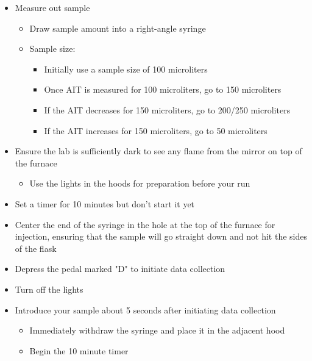 \documentclass[letterpaper,11pt]{article}
\begin{document}
\begin{itemize}
    \item Measure out sample
    
        \begin{itemize}
        \item Draw sample amount into a right-angle syringe
        \item Sample size:
        
            \begin{itemize}
            \item Initially use a sample size of 100 microliters
            \item Once AIT is measured for 100 microliters, go to 150 
                microliters
            \item If the AIT decreases for 150 microliters, go to 200/250 
                microliters
            \item If the AIT increases for 150 microliters, go to 50 microliters
            \end{itemize}
        
        \end{itemize}
        
    \item Ensure the lab is sufficiently dark to see any flame from the mirror
        on top of the furnace
        \begin{itemize}
        \item Use the lights in the hoods for preparation before your run
        \end{itemize}
    \item Set a timer for 10 minutes but don't start it yet
    \item Center the end of the syringe in the hole at the top of the furnace 
        for injection, ensuring that the sample will go straight down and not 
        hit the sides of the flask
    \item Depress the pedal marked "D" to initiate data collection
    \item Turn off the lights
    \item Introduce your sample about 5 seconds after initiating data 
        collection
        
        \begin{itemize}
        \item Immediately withdraw the syringe and place it in the adjacent hood
        \item Begin the 10 minute timer
        \end{itemize}    
            

\end{itemize}
\end{document}
